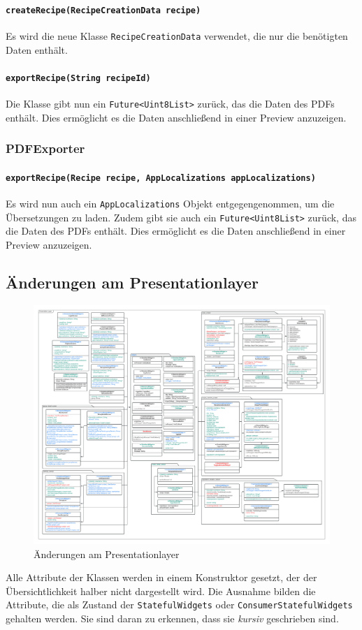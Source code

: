 \documentclass{implementierungsheft}
\begin{document}
\paragraph{\texttt{createRecipe(RecipeCreationData recipe)}}
Es wird die neue Klasse \texttt{RecipeCreationData} verwendet, die nur die benötigten Daten enthält.
\paragraph{\texttt{exportRecipe(String recipeId)}}
Die Klasse gibt nun ein \texttt{Future<Uint8List>} zurück, das die Daten des PDFs enthält. Dies ermöglicht es die Daten anschließend in einer Preview anzuzeigen.
\subsubsection{PDFExporter}
\paragraph{\texttt{exportRecipe(Recipe recipe, AppLocalizations appLocalizations)}}
Es wird nun auch ein \texttt{AppLocalizations} Objekt entgegengenommen, um die Übersetzungen zu laden. Zudem gibt sie auch ein \texttt{Future<Uint8List>} zurück, das die Daten des PDFs enthält. Dies ermöglicht es die Daten anschließend in einer Preview anzuzeigen.
\newpage
\subsection{Änderungen am Presentationlayer}
\begin{figure}[htp]
    \centering
    \includegraphics[width=\textwidth]{images/uml/presentationLayer.pdf}
    \caption{Änderungen am Presentationlayer}
    \label{fig:presentationLayer}
\end{figure}
Alle Attribute der Klassen werden in einem Konstruktor gesetzt, der der Übersichtlichkeit halber nicht dargestellt wird. Die Ausnahme bilden die Attribute, die als Zustand der \texttt{StatefulWidgets} oder \texttt{ConsumerStatefulWidgets} gehalten werden. Sie sind daran zu erkennen, dass sie \textit{kursiv} geschrieben sind.
\end{document}
